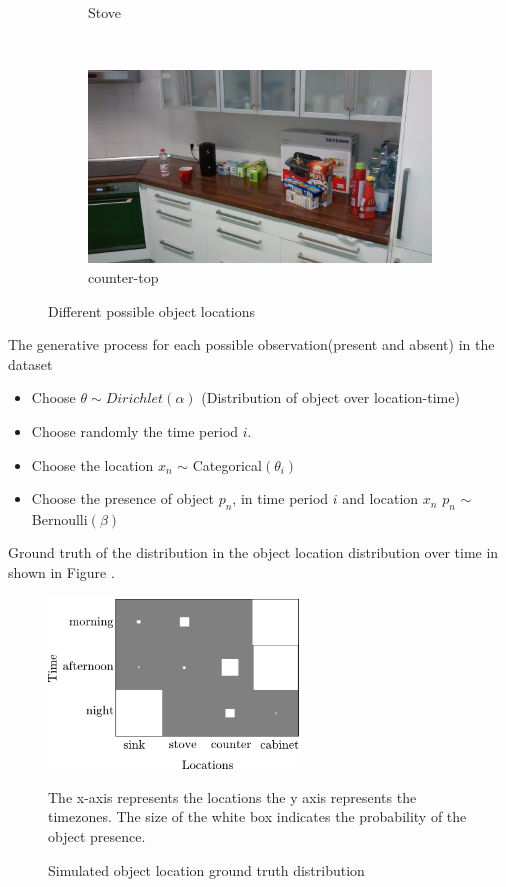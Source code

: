 \begin{figure}
\begin{subfigure}[b]{0.3\textwidth}
        \caption{Stove}
        \label{fig:stove}
    \end{subfigure}
    ~ %
    \begin{subfigure}[b]{0.3\textwidth}
        \includegraphics[width=\textwidth]{images/counter-top.jpg}
        \caption{counter-top}
        \label{fig:counter-top}
    \end{subfigure}
    \caption{Different possible object locations}\label{fig:alllocations}
\end{figure}

The generative process for each possible observation(present and absent) in the dataset 
\begin{itemize}
    \item Choose $ \theta \sim Dirichlet(\alpha)$ (Distribution of object over location-time)
    \item Choose randomly the time period $i$.
	\item Choose the location $x_n$ $\sim$ Categorical$(\theta_i)$
	\item Choose the presence of object $p_n$, in time period $i$ and location $x_n$  $p_n$ $\sim$ Bernoulli$(\beta) $
\end{itemize}

Ground truth of the distribution in the object location distribution over time in shown in Figure .


\begin{figure}[htp]
\centering
\includegraphics[width=0.6\textwidth]{images/absent_groundtruth.png}
\caption{Simulated object location ground truth distribution}
\medskip
\small
The x-axis represents the locations the y axis represents the timezones. The size of the white box indicates the probability of the object presence.
\label{absent-gt}
\end{figure}

